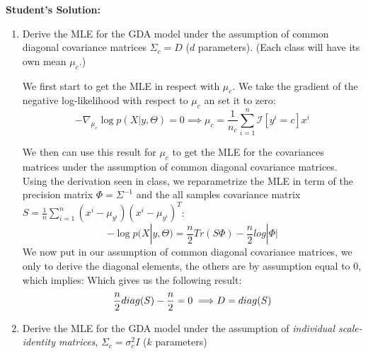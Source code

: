 \documentclass{article}
\begin{document}
\textbf{Student's Solution:}
\begin{enumerate}
\item Derive the MLE for the GDA model under the assumption of common diagonal covariance matrices $\Sigma_c = D$ ($d$ parameters). (Each class will have its own mean $\mu_c$.)
  
 We first start to get the MLE in respect with $\mu_c$. We take the gradient of the negative log-likelihood with respect to $\mu_c$ an set it to zero:
 \[ - \nabla_{\mu_c} \log p(X|y,\Theta)  = 0 \implies \mu_c= \frac{1}{n_c}\sum_{i=1}^n \mathcal{I}[y^i=c] x^i \]

 We then can use this result for $\mu_c$ to get the MLE for the covariances matrices under the assumption of common diagonal covariance matrices. Using the derivation seen in class, we reparametrize the MLE in term of the precision matrix $\Phi = \Sigma^{-1}$ and the all samples covariance matrix $S = \frac{1}{n} \sum_{i=1}^n (x^i - \mu_{y^i})(x^i - \mu_{y^i})^T$:
 \[- \log p(X|y,\Theta)  = \frac{n}{2} Tr(S \Phi) - \frac{n}{2} log|\Phi| \]
 We now put in our assumption of common diagonal covariance matrices, we only to derive the diagonal elements, the others are by assumption equal to 0, which implies:
 Which gives us the following result:
 \[
 \frac{n}{2} diag(S) - \frac{n}{2} = 0 \implies \\
 D = diag(S)
 \]
\item Derive the MLE for the GDA model under the assumption of \emph{individual scale-identity matrices}, $\Sigma_c = \sigma_c^2 I$ ($k$ parameters)
 

\end{enumerate}
\end{document}

